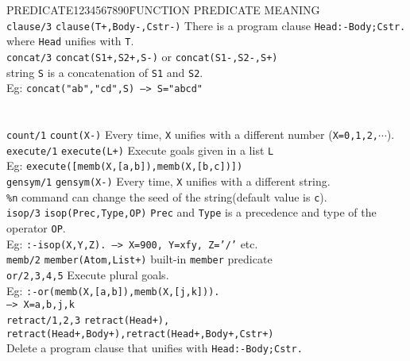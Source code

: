 \begin{tabbing}
PREDICATE1234567890\= FUNCTION \kill
PREDICATE	\> MEANING \\
{\tt clause/3} \> {\tt clause(T+,Body-,Cstr-)} There is a program clause
	{\tt Head:-Body;Cstr.} \\
	\> where {\tt Head} unifies with {\tt T}.\\
{\tt concat/3} \> {\tt concat(S1+,S2+,S-)} or {\tt concat(S1-,S2-,S+)}\\
	\> string {\tt S} is a concatenation of {\tt S1} and {\tt S2}.\\
	\>Eg: {\tt concat("ab","cd",S) --> S="abcd"}\\
	\>\hspace{19pt}{\tt concat(X,Y,"abc") -->}\\
	\>\hspace{20pt}{\tt X="",Y="abc" or X="a",Y="bc" or X="ab",Y="c" or X="abc",Y=""}\\
{\tt count/1} \> {\tt count(X-)} Every time, {\tt X} unifies with a
	different number ({\tt X=0,1,2,$\cdots$}).\\
{\tt execute/1} \> {\tt execute(L+)} Execute goals given in a 
list {\tt L}\\
	\> Eg: {\tt execute([memb(X,[a,b]),memb(X,[b,c])])}\\
{\tt gensym/1} \> {\tt gensym(X-)} Every time, {\tt X} unifies with
a different string.\\
	\> \verb-%n- command can change the seed of the string(default value is {\tt c}).\\
{\tt isop/3}	\> {\tt isop(Prec,Type,OP)} {\tt Prec} and {\tt Type}
is a precedence and type of the operator {\tt OP}.\\
	\> Eg: {\tt :-isop(X,Y,Z). --> X=900, Y=xfy, Z='/'} etc.\\
{\tt memb/2}	\> {\tt member(Atom,List+)} built-in {\tt member}
predicate\\
{\tt or/2,3,4,5}	\> Execute plural goals.\\
	\> Eg: {\tt :-or(memb(X,[a,b]),memb(X,[j,k])).}\\
	\> \hspace{20pt} {\tt --> X=a,b,j,k}\\
{\tt retract/1,2,3}	\> {\tt retract(Head+), retract(Head+,Body+),retract(Head+,Body+,Cstr+)}\\
	\> Delete a program clause that unifies with {\tt Head:-Body;Cstr.}\\
\end{tabbing}

